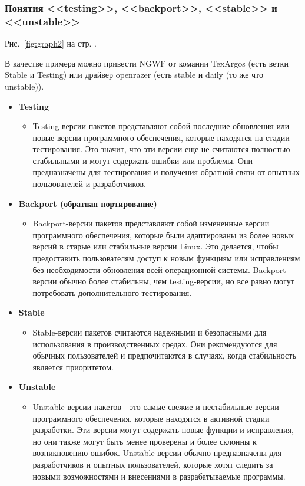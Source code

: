 \documentclass[oneside, final, 14pt]{extreport} %
\begin{document}
\subsubsection{Понятия <<testing>>, <<backport>>, <<stable>> и <<unstable>>}

Рис.~\ref{fig:graph2} на стр. \pageref*{fig:graph2}.

В качестве примера можно привести NGWF от комании TexArgos (есть ветки Stable и Testing)
или драйвер openrazer (есть stable и daily (то же что unstable)).

\begin{itemize}

    \item \textbf{Testing}
            \begin{itemize}
            \item Testing-версии пакетов представляют собой последние обновления или новые версии программного обеспечения, которые находятся на стадии тестирования. Это значит, что эти версии еще не считаются полностью стабильными и могут содержать ошибки или проблемы. Они предназначены для тестирования и получения обратной связи от опытных пользователей и разработчиков.
            \end{itemize}
    \item \textbf{Backport (обратная портирование)}
            \begin{itemize}
                \item Backport-версии пакетов представляют собой измененные версии программного обеспечения, которые были адаптированы из более новых версий в старые или стабильные версии Linux. Это делается, чтобы предоставить пользователям доступ к новым функциям или исправлениям без необходимости обновления всей операционной системы. Backport-версии обычно более стабильны, чем testing-версии, но все равно могут потребовать дополнительного тестирования.
            \end{itemize}
    \item \textbf{Stable}
            \begin{itemize}
                \item Stable-версии пакетов считаются надежными и безопасными для использования в производственных средах. Они рекомендуются для обычных пользователей и предпочитаются в случаях, когда стабильность является приоритетом.
            \end{itemize}
    \item \textbf{Unstable}
            \begin{itemize}
                \item Unstable-версии пакетов - это самые свежие и нестабильные версии программного обеспечения, которые находятся в активной стадии разработки. Эти версии могут содержать новые функции и исправления, но они также могут быть менее проверены и более склонны к возникновению ошибок. Unstable-версии обычно предназначены для разработчиков и опытных пользователей, которые хотят следить за новыми возможностями и внесениями в разрабатываемые программы.
            \end{itemize}
            
\end{itemize}
\end{document}
